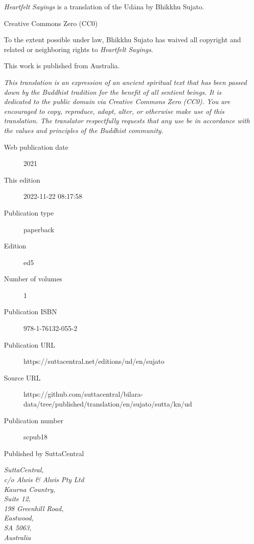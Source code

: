 \documentclass[12pt,openany]{book}%
\begin{document}
\begin{footnotesize}

\textit{Heartfelt Sayings} is a translation of the Udāna by Bhikkhu Sujato.

\medskip

Creative Commons Zero (CC0)

To the extent possible under law, Bhikkhu Sujato has waived all copyright and related or neighboring rights to \textit{Heartfelt Sayings}.

\medskip

This work is published from Australia.

\begin{center}
\textit{This translation is an expression of an ancient spiritual text that has been passed down by the Buddhist tradition for the benefit of all sentient beings. It is dedicated to the public domain via Creative Commons Zero (CC0). You are encouraged to copy, reproduce, adapt, alter, or otherwise make use of this translation. The translator respectfully requests that any use be in accordance with the values and principles of the Buddhist community.}
\end{center}

\medskip

\begin{description}
    \item[Web publication date] 2021
    \item[This edition] 2022-11-22 08:17:58
    \item[Publication type] paperback
    \item[Edition] ed5
    \item[Number of volumes] 1
    \item[Publication ISBN] 978-1-76132-055-2
    \item[Publication URL] https://suttacentral.net/editions/ud/en/sujato
    \item[Source URL] https://github.com/suttacentral/bilara-data/tree/published/translation/en/sujato/sutta/kn/ud
    \item[Publication number] scpub18
\end{description}

\medskip

Published by SuttaCentral

\medskip

\textit{SuttaCentral,\\
c/o Alwis \& Alwis Pty Ltd\\
Kaurna Country,\\
Suite 12,\\
198 Greenhill Road,\\
Eastwood,\\
SA 5063,\\
Australia}

\end{footnotesize}
\end{document}
